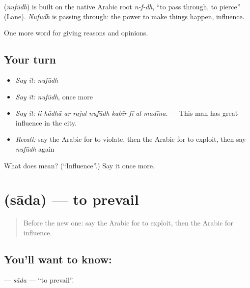 \begin{cousinweb}
\textbf{} (\emph{nufūdh}) is built on the native Arabic root \emph{n-f-dh}, \textquotedblleft{}to pass through, to pierce\textquotedblright{} (Lane). \emph{Nufūdh} is passing through: the power to make things happen, influence.
\end{cousinweb}

\begin{grammarlens}[title={What you've built}]
One more word for giving reasons and opinions.
\end{grammarlens}

\subsection*{Your turn}
\begin{itemize}
\raggedright
  \item \emph{Say it:} \emph{nufūdh}
  \item \emph{Say it:} \emph{nufūdh}, once more
  \item \emph{Say it:} \emph{li-hādhā ar-rajul nufūdh kabīr fī al-madīna.} — This man has great influence in the city.
  \item \emph{Recall:} say the Arabic for to violate, then the Arabic for to exploit, then say \emph{nufūdh} again
\end{itemize}

\begin{tcolorbox}[breakable,colback=teal!4,colframe=teal!35!black,title={Before you move on}]
What does  mean? (\textquotedblleft{}Influence\textquotedblright{}.) Say it once more.
\end{tcolorbox}
\section[\texorpdfstring{\ar{ساد} (sāda)}{ساد (sāda)}]{ (sāda) — to prevail}

\label{lesson:AR-C389-sada-prevail}



\begin{quote}
Before the new one: say the Arabic for to exploit, then the Arabic for influence.
\end{quote}

\subsection*{You'll want to know: }
\textbf{} — \emph{sāda} — \textquotedblleft{}to prevail\textquotedblright{}.

